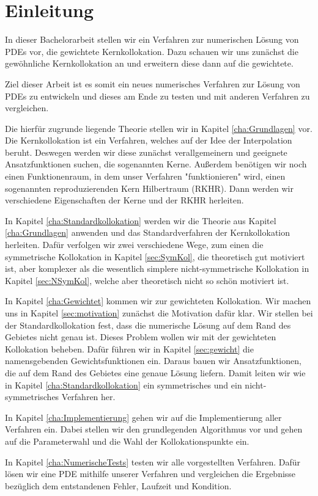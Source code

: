 \chapter{Einleitung}
\label{cha:Einleitung}
In dieser Bachelorarbeit stellen wir ein Verfahren zur numerischen Lösung von \acp{PDE} vor, die gewichtete Kernkollokation. Dazu schauen wir uns zunächst die gewöhnliche Kernkollokation an und erweitern diese dann auf die gewichtete.

Ziel dieser Arbeit ist es somit ein neues numerisches Verfahren zur Lösung von \acp{PDE} zu entwickeln und dieses am Ende zu testen und mit anderen Verfahren zu vergleichen.

Die hierfür zugrunde liegende Theorie stellen wir in Kapitel \ref{cha:Grundlagen} vor. Die Kernkollokation ist ein Verfahren, welches auf der Idee der Interpolation beruht. Deswegen werden wir diese zunächst verallgemeinern und geeignete Ansatzfunktionen suchen, die sogenannten Kerne. Außerdem benötigen wir noch einen Funktionenraum, in dem unser Verfahren "funktionieren" wird, einen sogenannten reproduzierenden Kern Hilbertraum (\acs{RKHR}).  Dann werden wir verschiedene Eigenschaften der Kerne und der \ac{RKHR} herleiten.

In Kapitel \ref{cha:Standardkollokation} werden wir die Theorie aus Kapitel \ref{cha:Grundlagen} anwenden und das Standardverfahren der Kernkollokation herleiten. Dafür verfolgen wir zwei verschiedene Wege, zum einen die symmetrische Kollokation in Kapitel \ref{sec:SymKol}, die theoretisch gut motiviert ist, aber komplexer als die wesentlich simplere nicht-symmetrische Kollokation in Kapitel \ref{sec:NSymKol}, welche aber theoretisch nicht so schön motiviert ist.

In Kapitel \ref{cha:Gewichtet} kommen wir zur gewichteten Kollokation. Wir machen uns in Kapitel \ref{sec:motivation} zunächst die Motivation dafür klar. Wir stellen bei der Standardkollokation fest, dass die numerische Lösung auf dem Rand des Gebietes nicht genau ist. Dieses Problem wollen wir mit der gewichteten Kollokation beheben. Dafür führen wir in Kapitel \ref{sec:gewicht} die namensgebenden Gewichtsfunktionen ein. Daraus bauen wir Ansatzfunktionen, die auf dem Rand des Gebietes eine genaue Lösung liefern. Damit leiten wir wie in Kapitel \ref{cha:Standardkollokation} ein symmetrisches und ein nicht-symmetrisches Verfahren her.

In Kapitel \ref{cha:Implementierung} gehen wir auf die Implementierung aller Verfahren ein. Dabei stellen wir den grundlegenden Algorithmus vor und gehen auf die Parameterwahl und die Wahl der Kollokationspunkte ein.

In Kapitel \ref{cha:NumerischeTests} testen wir alle vorgestellten Verfahren. Dafür lösen wir eine \ac{PDE} mithilfe unserer Verfahren und vergleichen die Ergebnisse bezüglich dem entstandenen Fehler, Laufzeit und Kondition.

\glsresetall